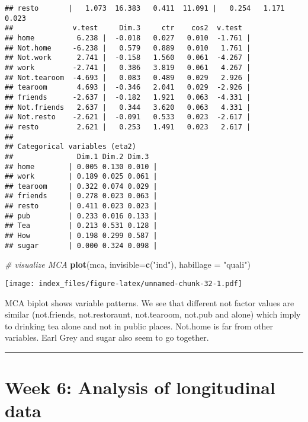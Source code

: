 \documentclass[]{article}
\newenvironment{Shaded}{\begin{snugshade}}{\end{snugshade}}
\newcommand{\KeywordTok}[1]{\textcolor[rgb]{0.13,0.29,0.53}{\textbf{#1}}}
\newcommand{\DataTypeTok}[1]{\textcolor[rgb]{0.13,0.29,0.53}{#1}}
\newcommand{\StringTok}[1]{\textcolor[rgb]{0.31,0.60,0.02}{#1}}
\newcommand{\CommentTok}[1]{\textcolor[rgb]{0.56,0.35,0.01}{\textit{#1}}}
\newcommand{\NormalTok}[1]{#1}
\begin{document}
\begin{verbatim}
## resto       |   1.073  16.383   0.411  11.091 |   0.254   1.171   0.023
##              v.test     Dim.3     ctr    cos2  v.test  
## home          6.238 |  -0.018   0.027   0.010  -1.761 |
## Not.home     -6.238 |   0.579   0.889   0.010   1.761 |
## Not.work      2.741 |  -0.158   1.560   0.061  -4.267 |
## work         -2.741 |   0.386   3.819   0.061   4.267 |
## Not.tearoom  -4.693 |   0.083   0.489   0.029   2.926 |
## tearoom       4.693 |  -0.346   2.041   0.029  -2.926 |
## friends      -2.637 |  -0.182   1.921   0.063  -4.331 |
## Not.friends   2.637 |   0.344   3.620   0.063   4.331 |
## Not.resto    -2.621 |  -0.091   0.533   0.023  -2.617 |
## resto         2.621 |   0.253   1.491   0.023   2.617 |
## 
## Categorical variables (eta2)
##               Dim.1 Dim.2 Dim.3  
## home        | 0.005 0.130 0.010 |
## work        | 0.189 0.025 0.061 |
## tearoom     | 0.322 0.074 0.029 |
## friends     | 0.278 0.023 0.063 |
## resto       | 0.411 0.023 0.023 |
## pub         | 0.233 0.016 0.133 |
## Tea         | 0.213 0.531 0.128 |
## How         | 0.198 0.299 0.587 |
## sugar       | 0.000 0.324 0.098 |
\end{verbatim}

\begin{Shaded}
\begin{Highlighting}[]
\CommentTok{# visualize MCA}
\KeywordTok{plot}\NormalTok{(mca, }\DataTypeTok{invisible=}\KeywordTok{c}\NormalTok{(}\StringTok{"ind"}\NormalTok{), }\DataTypeTok{habillage =} \StringTok{"quali"}\NormalTok{)}
\end{Highlighting}
\end{Shaded}

\texttt{[image: index\_files/figure-latex/unnamed-chunk-32-1.pdf]}

MCA biplot shows variable patterns. We see that different not factor
values are similar (not.friends, not.restoraunt, not.tearoom, not.pub
and alone) which imply to drinking tea alone and not in public places.
Not.home is far from other variables. Earl Grey and sugar also seem to
go together.

\begin{center}\rule{0.5\linewidth}{\linethickness}\end{center}

\section{Week 6: Analysis of longitudinal
data}\label{week-6-analysis-of-longitudinal-data}
\end{document}
